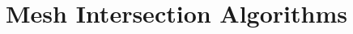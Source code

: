 \documentclass[bibliography=totocnumbered,dvipsnames,FM,Dis]{tulthesis}
\begin{document}

\chapter{Mesh Intersection Algorithms} \label{chap:intersections}






% 
% 
%
% 
\end{document}
